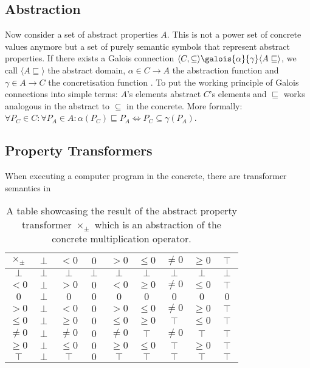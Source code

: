 \documentclass{report}
\begin{document}
\subsection{Abstraction}

Now consider a set of abstract properties $A$. This is not a power set of concrete values anymore but a set of purely semantic symbols that represent abstract properties. If there exists a Galois connection $\langle C,\subseteq\rangle \galois{\alpha}{\gamma}\langle A\sqsubseteq\rangle$, we call $\langle A\sqsubseteq\rangle$ the abstract domain, $\alpha\in C\to A$ the abstraction function and $\gamma\in A\to C$ the concretisation function \cite[chapter 11]{cousot2021}. To put the working principle of Galois connections into simple terms: $A$'s elements abstract $C$'s elements and $\sqsubseteq$ works analogous in the abstract to $\subseteq$ in the concrete. More formally: $\forall P_C\in C:\forall P_A \in A:\alpha(P_C)\sqsubseteq P_A \Longleftrightarrow P_C \subseteq \gamma(P_A)$.



\subsection{Property Transformers}

When executing a computer program in the concrete, there are transformer semantics in 

\begin{table}[hbt]
\begin{center}
\begin{tabular}{c|c|c|c|c|c|c|c|c}
            $\times_\pm$& $\perp$ & $<0$    & $0$     & $>0$    & $\leq0$ & $\neq0$ & $\geq0$ & $\top$  \\ \hline
            $\perp$ & $\perp$ & $\perp$ & $\perp$ & $\perp$ & $\perp$ & $\perp$ & $\perp$ & $\perp$ \\
            $<0$    & $\perp$ & $>0$    & $0$     & $<0$    & $\geq0$ & $\neq0$ & $\leq0$ & $\top$  \\
            $0$     & $\perp$ & $0$     & $0$     & $0$     & $0$     & $0$     & $0$     & $0$     \\
            $>0$    & $\perp$ & $<0$    & $0$     & $>0$    & $\leq0$ & $\neq0$ & $\geq0$ & $\top$  \\
            $\leq0$ & $\perp$ & $\geq0$ & $0$     & $\leq0$ & $\geq0$ & $\top$  & $\leq0$ & $\top$  \\
            $\neq0$ & $\perp$ & $\neq0$ & $0$     & $\neq0$ & $\top$  & $\neq0$ & $\top$  & $\top$  \\
            $\geq0$ & $\perp$ & $\leq0$ & $0$     & $\geq0$ & $\leq0$ & $\top$  & $\geq0$ & $\top$  \\
            $\top$  & $\perp$ & $\top$  & $0$     & $\top$  & $\top$  & $\top$  & $\top$  & $\top$ 
        \end{tabular}
  \caption{A table showcasing the result of the abstract property transformer $\times_\pm$ which is an abstraction of the concrete multiplication operator.}\label{table:multiply}
  \end{center}
\end{table}
\end{document}
